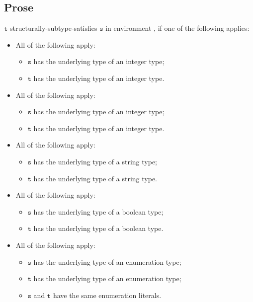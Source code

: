 \documentclass{book}
\newcommand\vt[0]{\texttt{t}}
\newcommand\vs[0]{\texttt{s}}
\begin{document}
\subsection{Prose}
$\vt$ structurally-subtype-satisfies $\vs$ in environment \tenv, if one of the following applies:
  \begin{itemize}
  \item All of the following apply:
    \begin{itemize}
    \item $\vs$ has the underlying type of an integer type;
    \item $\vt$ has the underlying type of an integer type.
    \end{itemize}

  \item All of the following apply:
    \begin{itemize}
    \item $\vs$ has the underlying type of an integer type;
    \item $\vt$ has the underlying type of an integer type.
    \end{itemize}

  \item All of the following apply:
    \begin{itemize}
    \item $\vs$ has the underlying type of a string type;
    \item $\vt$ has the underlying type of a string type.
    \end{itemize}

  \item All of the following apply:
    \begin{itemize}
    \item $\vs$ has the underlying type of a boolean type;
    \item $\vt$ has the underlying type of a boolean type.
    \end{itemize}

  \item All of the following apply:
    \begin{itemize}
    \item $\vs$ has the underlying type of an enumeration type;
    \item $\vt$ has the underlying type of an enumeration type;
    \item $\vs$ and $\vt$ have the same enumeration literals.
   \end{itemize}


\end{itemize}
\end{document}
